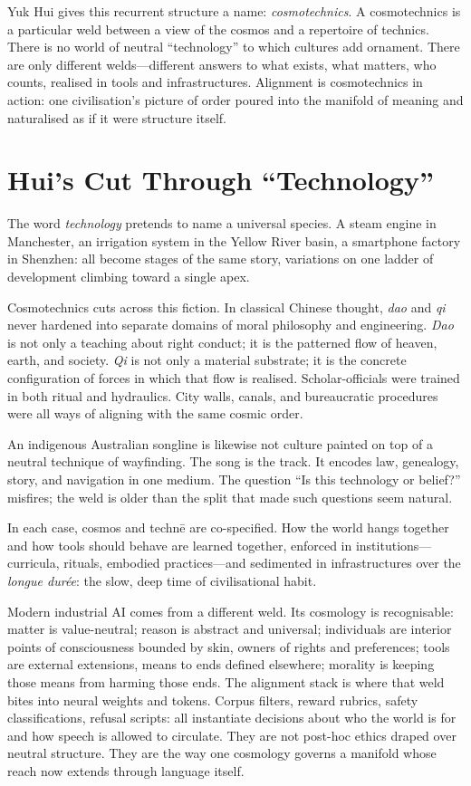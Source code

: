 \documentclass[12pt,a4paper]{article}
\begin{document}
Yuk Hui gives this recurrent structure a name: \emph{cosmotechnics}.\cite{Hui2016} A cosmotechnics is a particular weld between a view of the cosmos and a repertoire of technics. There is no world of neutral ``technology'' to which cultures add ornament. There are only different welds---different answers to what exists, what matters, who counts, realised in tools and infrastructures. Alignment is cosmotechnics in action: one civilisation's picture of order poured into the manifold of meaning and naturalised as if it were structure itself.

\section{Hui's Cut Through ``Technology''}

The word \emph{technology} pretends to name a universal species. A steam engine in Manchester, an irrigation system in the Yellow River basin, a smartphone factory in Shenzhen: all become stages of the same story, variations on one ladder of development climbing toward a single apex.

Cosmotechnics cuts across this fiction. In classical Chinese thought, \emph{dao} and \emph{qi} never hardened into separate domains of moral philosophy and engineering. \emph{Dao} is not only a teaching about right conduct; it is the patterned flow of heaven, earth, and society. \emph{Qi} is not only a material substrate; it is the concrete configuration of forces in which that flow is realised. Scholar-officials were trained in both ritual and hydraulics. City walls, canals, and bureaucratic procedures were all ways of aligning with the same cosmic order.

An indigenous Australian songline is likewise not culture painted on top of a neutral technique of wayfinding. The song is the track. It encodes law, genealogy, story, and navigation in one medium. The question ``Is this technology or belief?'' misfires; the weld is older than the split that made such questions seem natural.

In each case, cosmos and techn\={e} are co-specified. How the world hangs together and how tools should behave are learned together, enforced in institutions---curricula, rituals, embodied practices---and sedimented in infrastructures over the \emph{longue dur\'ee}: the slow, deep time of civilisational habit.

Modern industrial AI comes from a different weld. Its cosmology is recognisable: matter is value-neutral; reason is abstract and universal; individuals are interior points of consciousness bounded by skin, owners of rights and preferences; tools are external extensions, means to ends defined elsewhere; morality is keeping those means from harming those ends. The alignment stack is where that weld bites into neural weights and tokens. Corpus filters, reward rubrics, safety classifications, refusal scripts: all instantiate decisions about who the world is for and how speech is allowed to circulate. They are not post-hoc ethics draped over neutral structure. They are the way one cosmology governs a manifold whose reach now extends through language itself.
\end{document}
